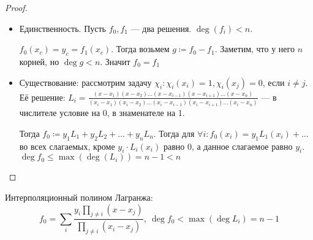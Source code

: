 \begin{proof}
    \slashn
    \begin{itemize}
    \item Единственность. Пусть $f_0, f_1$ --- два решения.  $\deg(f_i) < n$.  

        $f_0(x_c) = y_c = f_1(x_c)$. Тогда возьмем $g \coloneqq f_0 - f_1$. Заметим, что у него  $n$ корней, но  $\deg g< n$. Значит  $f_0=f_1$
\item Существование: рассмотрим задачу $\chi_i\!: \chi_i(x_i) = 1, \chi_i(x_j) = 0$, если  $i \neq j$. Её решение:  $L_i = \frac{(x-x_1)(x-x_2)\ldots(x - x_{i-1})(x - x_{i+1})\ldots(x - x_n)}{(x_i - x_1)(x_i - x_2)\ldots(x_i - x_{i - 1}) (x_i - x_{i+1}) \ldots (x_i - x_n)}$ --- в числителе условие на 0, в знаменателе на 1.

	Тогда $f_0 \coloneqq y_1 L_1 + y_2 L_2 + \ldots +y_nL_n$. Тогда для $\forall i\!: f_0(x_i) = y_1L_1(x_i) + \ldots$ во всех слагаемых, кроме $y_i \cdot L_i(x_i)$ равно 0, а данное слагаемое равно  $y_i$. $\deg f_0 \le \max(\deg(L_i)) = n - 1 < n$
    \end{itemize}
\end{proof}
\begin{definition}
Интерполяционный полином Лагранжа: \[f_0 = \sum_i \frac{y_i \prod_{j \neq i}(x - x_j)}{\prod_{j \neq i}(x_i - x_j)},\ \deg f_0 < \max(\deg L_i) = n-1\]
\end{definition}

